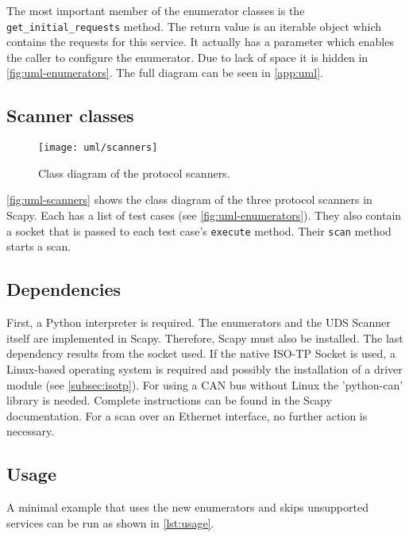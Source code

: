 The most important member of the enumerator classes is the \texttt{get_initial_requests} method. The return value is an iterable object which contains the requests for this service. It actually has a parameter which enables the caller to configure the enumerator. Due to lack of space it is hidden in \autoref{fig:uml-enumerators}. The full diagram can be seen in \autoref{app:uml}.


\subsection{Scanner classes}

\begin{figure}[htb]
    \centering
    \texttt{[image: uml/scanners]}
    \caption{Class diagram of the protocol scanners.}
    \label{fig:uml-scanners}
\end{figure}

\autoref{fig:uml-scanners} shows the class diagram of the three protocol scanners in Scapy. Each has a list of test cases (see \autoref{fig:uml-enumerators}). They also contain a socket that is passed to each test case's \texttt{execute} method. Their \texttt{scan} method starts a scan.

\subsection{Dependencies}

First, a Python interpreter is required.
The enumerators and the UDS Scanner itself are implemented in Scapy. Therefore, Scapy must also be installed. The last dependency results from the socket used. If the native ISO-TP Socket is used, a Linux-based operating system is required and possibly the installation of a driver module (see \autoref{subsec:isotp}). For using a CAN bus without Linux the 'python-can' library is needed. Complete instructions can be found in the Scapy documentation. For a scan over an Ethernet interface, no further action is necessary.

\subsection{Usage}

A minimal example that uses the new enumerators and skips unsupported services can be run as shown in \autoref{lst:usage}.


